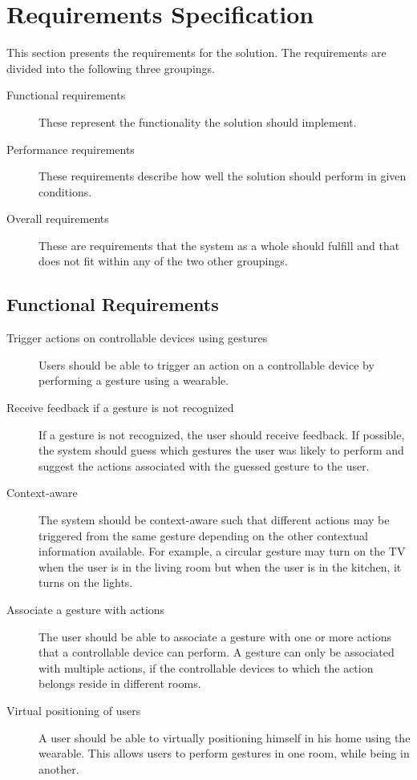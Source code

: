 \section{Requirements Specification}
\label{sec:requirements-specification}

This section presents the requirements for the solution. The requirements are divided into the following three groupings.

\begin{description}
\item[Functional requirements] These represent the functionality the solution should implement.
\item[Performance requirements] These requirements describe how well the solution should perform in given conditions.
\item[Overall requirements] These are requirements that the system as a whole should fulfill and that does not fit within any of the two other groupings.
\end{description}

\subsection{Functional Requirements}

\begin{description}
\item[Trigger actions on controllable devices using gestures] Users should be able to trigger an action on a controllable device by performing a gesture using a wearable.
\item[Receive feedback if a gesture is not recognized] If a gesture is not recognized, the user should receive feedback. If possible, the system should guess which gestures the user was likely to perform and suggest the actions associated with the guessed gesture to the user.
\item[Context-aware] The system should be context-aware such that different actions may be triggered from the same gesture depending on the other contextual information available. For example, a circular gesture may turn on the TV when the user is in the living room but when the user is in the kitchen, it turns on the lights.
\item[Associate a gesture with actions] The user should be able to associate a gesture with one or more actions that a controllable device can perform. A gesture can only be associated with multiple actions, if the controllable devices to which the action belongs reside in different rooms.
\item[Virtual positioning of users] A user should be able to virtually positioning himself in his home using the wearable. This allows users to perform gestures in one room, while being in another.
\end{description}

